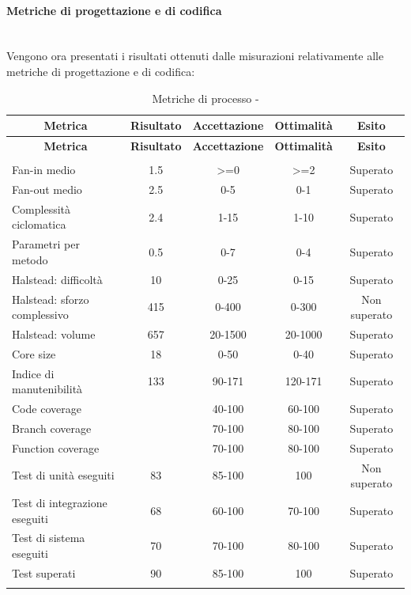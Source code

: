 \paragraph{Metriche di progettazione e di codifica}\mbox{}\\
Vengono ora presentati i risultati ottenuti dalle misurazioni relativamente alle metriche di progettazione e di codifica:
\begin{longtable}{|m{5cm}|c|c|c|c|}
	\hline \multicolumn{1}{|c|}{\textbf{Metrica}} & \multicolumn{1}{c|}{\textbf{Risultato}} & \multicolumn{1}{c|}{\textbf{Accettazione}} & \multicolumn{1}{c|}{\textbf{Ottimalità}} & \multicolumn{1}{c|}{\textbf{Esito}}\\
	\hline 
	\endfirsthead
	
	\hline \multicolumn{1}{|c|}{\textbf{Metrica}} & \multicolumn{1}{c|}{\textbf{Risultato}} & \multicolumn{1}{c|}{\textbf{Accettazione}} & \multicolumn{1}{c|}{\textbf{Ottimalità}} & \multicolumn{1}{c|}{\textbf{Esito}}\\
	\hline 
	\endhead
	
	\hline \multicolumn{5}{|r|}{\ToBeContinued} \\ 
	\hline
	\endfoot
	
	\endlastfoot
	
	\hline Fan-in medio & 1.5 & >=0 & >=2 & Superato \\
	\hline Fan-out medio & 2.5 & 0-5 & 0-1 & Superato \\
	\hline Complessità ciclomatica & 2.4 & 1-15 & 1-10 & Superato \\
	\hline Parametri per metodo & 0.5 & 0-7 & 0-4 & Superato \\
	\hline Halstead: difficoltà & 10 & 0-25 & 0-15 & Superato \\
	\hline Halstead: sforzo complessivo & 415 & 0-400 & 0-300 & Non superato\\
	\hline Halstead: volume & 657 & 20-1500 & 20-1000 & Superato \\
	\hline Core size & 18 & 0-50 & 0-40 & Superato \\
	\hline Indice di manutenibilità & 133 & 90-171 & 120-171 & Superato \\
	\hline Code coverage &  & 40-100 & 60-100 & Superato \\
	\hline Branch coverage &  & 70-100 & 80-100 & Superato \\
	\hline Function coverage &  & 70-100 & 80-100 & Superato \\
	\hline Test di unità eseguiti & 83 & 85-100 & 100 & Non superato \\
	\hline Test di integrazione eseguiti & 68 & 60-100 & 70-100 & Superato \\
	\hline Test di sistema eseguiti & 70 & 70-100 & 80-100 & Superato \\
	\hline Test superati & 90 & 85-100 & 100 & Superato \\
	\hline
	\caption{Metriche di processo - \RA{}}
\end{longtable}

